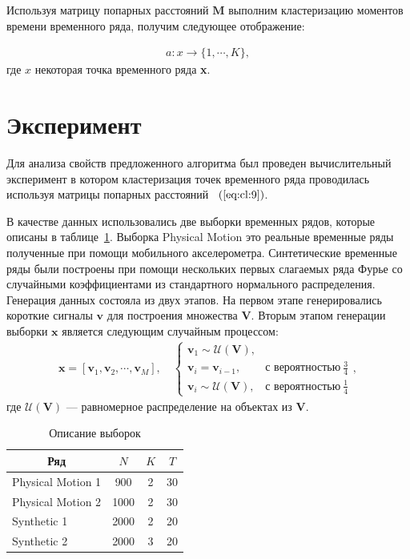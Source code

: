 \documentclass[12pt, twoside]{article}
\numberwithin{equation}{section}
\begin{document}
Используя матрицу попарных расстояний $\textbf{M}$ выполним кластеризацию моментов времени временного ряда, получим следующее отображение:

\begin{equation}
\label{eq:cl:10}
\begin{aligned}
a : x \to \{1,\cdots, K\}, 
\end{aligned}
\end{equation}
где $x$ некоторая точка временного ряда \textbf{x}.


\section{Эксперимент}
Для анализа свойств предложенного алгоритма был проведен вычислительный эксперимент в котором кластеризация точек временного ряда проводилась используя матрицы попарных расстояний ~$(\ref{eq:cl:9})$.

В качестве данных использовались две выборки временных рядов, которые описаны в таблице~\ref{table_1}. Выборка Physical Motion это реальные временные ряды полученные при помощи мобильного акселерометра. Синтетические временные ряды были построены при помощи нескольких первых слагаемых ряда Фурье со случайными коэффициентами из стандартного нормального распределения. Генерация данных состояла из двух этапов. На первом этапе генерировались короткие сигналы $\textbf{v}$ для построения множества $\mathbf{V}$. Вторым этапом генерации выборки $\textbf{x}$ является следующим случайным процессом:
\begin{equation}
\label{eq:exp:1}
\begin{aligned}
\textbf{x} = [\textbf{v}_{1}, \textbf{v}_{2}, \cdots, \textbf{v}_{M}], \quad \begin{cases}
    \textbf{v}_{1} \sim \mathcal{U}\left(\mathbf{V}\right),\\
    \textbf{v}_{i} = \textbf{v}_{i - 1}, & \text{с вероятностью}~\frac{3}{4}\\
    \textbf{v}_{i} \sim \mathcal{U}\left(\mathbf{V}\right), & \text{с вероятностью}~\frac{1}{4}
\end{cases},
\end{aligned}
\end{equation}
где $\mathcal{U}\left(\mathbf{V}\right)$ --- равномерное распределение на объектах из $\mathbf{V}$.

\begin{table}[h!t]
\begin{center}
\caption{Описание выборок}
\label{table_1}
\begin{tabular}{|c|c|c|c|}
\hline
	Ряд & $N$& $K$& $T$\\
	\hline
	\multicolumn{1}{|l|}{Physical Motion 1}
	& 900& 2& 30\\
	\hline
	\multicolumn{1}{|l|}{Physical Motion 2}
	& 1000& 2& 30\\
	\hline
	\multicolumn{1}{|l|}{Synthetic 1}
	& 2000& 2& 20\\
	\hline
	\multicolumn{1}{|l|}{Synthetic 2}
	& 2000& 3& 20\\
\hline

\end{tabular}
\end{center}
\end{table}
\end{document}
